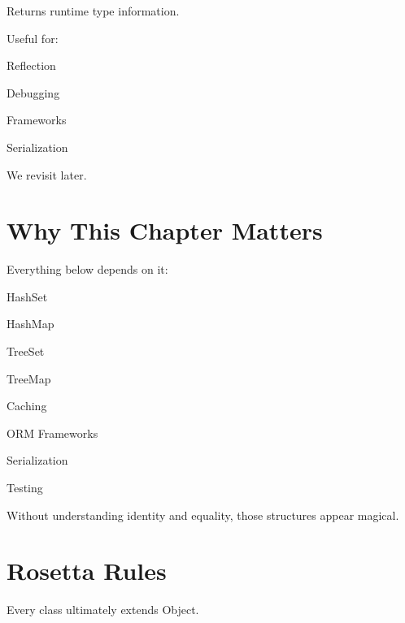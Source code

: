 \documentclass[11pt,a4paper]{book}
\begin{document}

Returns runtime type information.


Useful for:


Reflection

Debugging

Frameworks

Serialization


We revisit later.


\section{Why This Chapter Matters}

Everything below depends on it:


HashSet

HashMap

TreeSet

TreeMap

Caching

ORM Frameworks

Serialization

Testing


Without understanding identity and equality,
those structures appear magical.


\section{Rosetta Rules}

\begin{rosettarule}

Every class ultimately extends Object.

\end{rosettarule}

\end{document}
